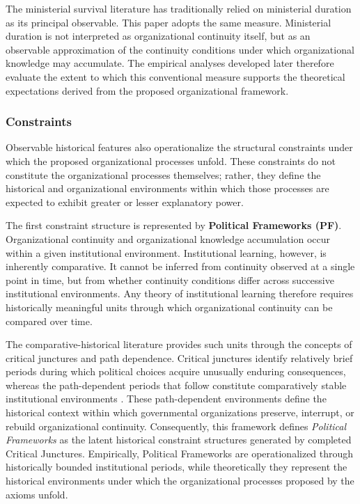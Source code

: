 \documentclass[doc, 12pt, a4paper,floatsintext]{apa7}
\begin{document}
The ministerial survival literature has traditionally relied on ministerial duration as its principal observable. This paper adopts the same measure. Ministerial duration is not interpreted as organizational continuity itself, but as an observable approximation of the continuity conditions under which organizational knowledge may accumulate. The empirical analyses developed later therefore evaluate the extent to which this conventional measure supports the theoretical expectations derived from the proposed organizational framework.
%
\subsubsection{Constraints}

Observable historical features also operationalize the structural constraints under which the proposed organizational processes unfold. These constraints do not constitute the organizational processes themselves; rather, they define the historical and organizational environments within which those processes are expected to exhibit greater or lesser explanatory power.

The first constraint structure is represented by \textbf{Political Frameworks (PF)}. Organizational continuity and organizational knowledge accumulation occur within a given institutional environment. Institutional learning, however, is inherently comparative. It cannot be inferred from continuity observed at a single point in time, but from whether continuity conditions differ across successive institutional environments. Any theory of institutional learning therefore requires historically meaningful units through which organizational continuity can be compared over time.

The comparative-historical literature provides such units through the concepts of critical junctures and path dependence. Critical junctures identify relatively brief periods during which political choices acquire unusually enduring consequences, whereas the path-dependent periods that follow constitute comparatively stable institutional environments \parencite{capoccia_study_2007,collier_critical_2022}. These path-dependent environments define the historical context within which governmental organizations preserve, interrupt, or rebuild organizational continuity. Consequently, this framework defines \emph{Political Frameworks} as the latent historical constraint structures generated by completed Critical Junctures. Empirically, Political Frameworks are operationalized through historically bounded institutional periods, while theoretically they represent the historical environments under which the organizational processes proposed by the axioms unfold.
\end{document}
